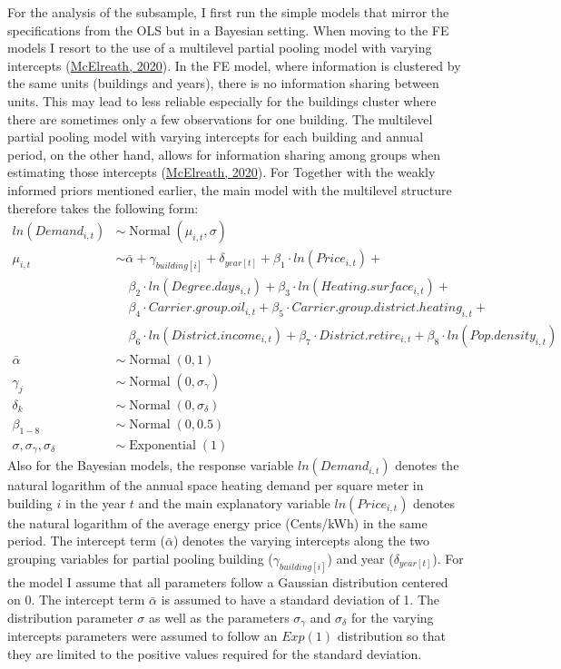 \documentclass[12pt,twoside]{reedthesis}
\begin{document}
For the analysis of the subsample, I first run the simple models that mirror the specifications from the OLS but in a Bayesian setting. When moving to the FE models I resort to the use of a multilevel partial pooling model with varying intercepts (\protect\hyperlink{ref-mcelreath20}{McElreath, 2020}). In the FE model, where information is clustered by the same units (buildings and years), there is no information sharing between units. This may lead to less reliable especially for the buildings cluster where there are sometimes only a few observations for one building. The multilevel partial pooling model with varying intercepts for each building and annual period, on the other hand, allows for information sharing among groups when estimating those intercepts (\protect\hyperlink{ref-mcelreath20}{McElreath, 2020}). For Together with the weakly informed priors mentioned earlier, the main model with the multilevel structure therefore takes the following form:
\begin{align*}
ln(Demand_{i,t}) & \sim \operatorname{Normal}(\mu_{i,t}, \sigma) \\
\mu_{i,t} & \sim \bar\alpha + \gamma_{building[i]} + \delta_{year[t]} + \beta_1 \cdot ln(Price_{i,t}) +  \\
 & \quad \beta_{2} \cdot ln(Degree.days_{i,t}) + \beta_{3} \cdot ln(Heating.surface_{i,t}) + \\
 & \quad \beta_{4} \cdot Carrier.group.oil_{i,t} + \beta_{5} \cdot Carrier.group.district.heating_{i,t} + \\
 & \quad \beta_{6} \cdot ln(District.income_{i,t}) + \beta_{7} \cdot District.retire_{i,t} + \beta_{8} \cdot ln(Pop.density_{i,t}) \\
\bar\alpha & \sim \operatorname{Normal}(0, 1) \\
\gamma_j & \sim \operatorname{Normal}(0, \sigma_{\gamma}) \\
\delta_k & \sim \operatorname{Normal}(0, \sigma_{\delta}) \\
\beta_{1-8} & \sim \operatorname{Normal}(0, 0.5) \\
\sigma, \sigma_{\gamma}, \sigma_{\delta} & \sim \operatorname{Exponential}(1)
\end{align*}
Also for the Bayesian models, the response variable \(ln(Demand_{i,t})\) denotes the natural logarithm of the annual space heating demand per square meter in building \(i\) in the year \(t\) and the main explanatory variable \(ln(Price_{i,t})\) denotes the natural logarithm of the average energy price (Cents/kWh) in the same period. The intercept term (\(\bar \alpha\)) denotes the varying intercepts along the two grouping variables for partial pooling building (\(\gamma_{building[i]}\)) and year (\(\delta_{year[t]}\)). For the model I assume that all parameters follow a Gaussian distribution centered on 0. The intercept term \(\bar \alpha\) is assumed to have a standard deviation of 1. The distribution parameter \(\sigma\) as well as the parameters \(\sigma_{\gamma}\) and \(\sigma_{\delta}\) for the varying intercepts parameters were assumed to follow an \(Exp(1)\) distribution so that they are limited to the positive values required for the standard deviation.
\end{document}
